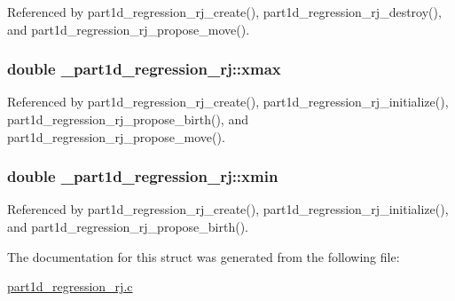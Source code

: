 Referenced by part1d\+\_\+regression\+\_\+rj\+\_\+create(), part1d\+\_\+regression\+\_\+rj\+\_\+destroy(), and part1d\+\_\+regression\+\_\+rj\+\_\+propose\+\_\+move().

\subsubsection[{\texorpdfstring{xmax}{xmax}}]{\setlength{\rightskip}{0pt plus 5cm}double \+\_\+part1d\+\_\+regression\+\_\+rj\+::xmax}\hypertarget{struct__part1d__regression__rj_ab178036195fd65240d1b970382539130}{}\label{struct__part1d__regression__rj_ab178036195fd65240d1b970382539130}


Referenced by part1d\+\_\+regression\+\_\+rj\+\_\+create(), part1d\+\_\+regression\+\_\+rj\+\_\+initialize(), part1d\+\_\+regression\+\_\+rj\+\_\+propose\+\_\+birth(), and part1d\+\_\+regression\+\_\+rj\+\_\+propose\+\_\+move().

\subsubsection[{\texorpdfstring{xmin}{xmin}}]{\setlength{\rightskip}{0pt plus 5cm}double \+\_\+part1d\+\_\+regression\+\_\+rj\+::xmin}\hypertarget{struct__part1d__regression__rj_a799df9b1af0d41a070efc21472a54c18}{}\label{struct__part1d__regression__rj_a799df9b1af0d41a070efc21472a54c18}


Referenced by part1d\+\_\+regression\+\_\+rj\+\_\+create(), part1d\+\_\+regression\+\_\+rj\+\_\+initialize(), and part1d\+\_\+regression\+\_\+rj\+\_\+propose\+\_\+birth().



The documentation for this struct was generated from the following file\+:\begin{DoxyCompactItemize}
\item 
\hyperlink{part1d__regression__rj_8c}{part1d\+\_\+regression\+\_\+rj.\+c}\end{DoxyCompactItemize}
